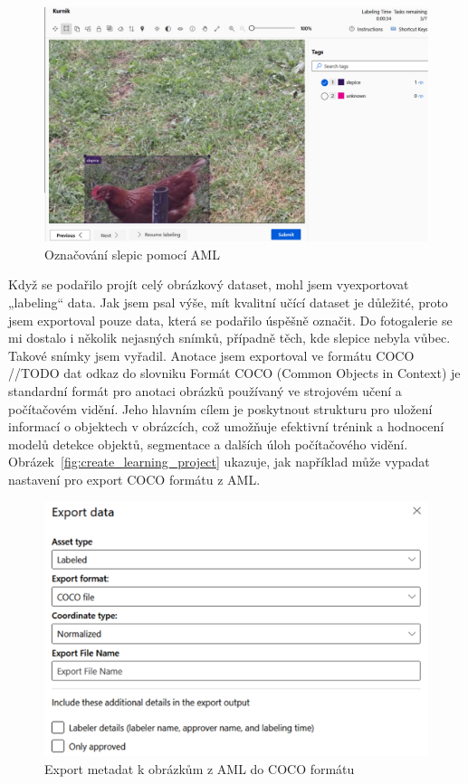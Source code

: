 \begin{figure}[htbp]
    \centering
    \includegraphics[width=1.0\textwidth]{img/chicken_labeling}
    \caption{Označování slepic pomocí AML}
    \label{fig:chicken_labeling}
\end{figure}

Když se podařilo projít celý obrázkový dataset, mohl jsem vyexportovat „labeling“ data.
Jak jsem psal výše, mít kvalitní učící dataset je důležité, proto jsem exportoval pouze data, která se podařilo úspěšně označit.
Do fotogalerie se mi dostalo i několik nejasných snímků, případně těch, kde slepice nebyla vůbec.
Takové snímky jsem vyřadil.
Anotace jsem exportoval ve formátu COCO  //TODO dat odkaz do slovniku
Formát COCO (Common Objects in Context) je standardní formát pro anotaci obrázků používaný ve strojovém učení a počítačovém vidění.
Jeho hlavním cílem je poskytnout strukturu pro uložení informací o objektech v obrázcích, což umožňuje efektivní trénink a hodnocení modelů detekce objektů, segmentace a dalších úloh počítačového vidění.
Obrázek~\ref{fig:create_learning_project} ukazuje, jak například může vypadat nastavení pro export COCO formátu z AML.

\begin{figure}[htbp]
    \centering
    \includegraphics[width=1.0\textwidth]{img/export_coco_format}
    \caption{Export metadat k obrázkům z AML do COCO formátu}
    \label{fig:export_coco_format}
\end{figure}

